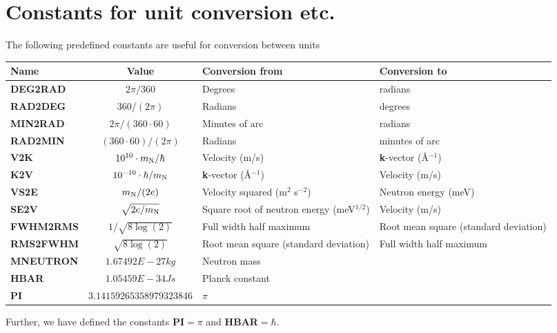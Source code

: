 \section{Constants for unit conversion etc.}
The following predefined constants are useful for conversion
between units
\def\textvb{\textbf}
\begin{center}
\begin{tabular}{|l|c|p{}|p{}|}
\hline
Name & Value & Conversion from & Conversion to \\ \hline
\textvb{DEG2RAD} & $2 \pi / 360$ & Degrees & radians \\
\textvb{RAD2DEG} & $360 / (2 \pi)$ & Radians & degrees \\
\textvb{MIN2RAD} & $2 \pi / (360 \cdot 60)$ 
  & Minutes of arc & radians \\
\textvb{RAD2MIN} & $(360\cdot 60) / (2 \pi)$ 
  & Radians & minutes of arc \\
\textvb{V2K} & $10^{10} \cdot m_{\rm N}/\hbar$ 
  & Velocity (m/s) & {\bf k}-vector (\AA$^{-1}$) \\ 
\textvb{K2V} & $10^{-10} \cdot \hbar / m_{\rm N}$ 
  & {\bf k}-vector (\AA$^{-1}$) & Velocity (m/s) \\
\textvb{VS2E} & $m_{\rm N} / (2 e)$
  & Velocity squared (m$^2$ s$^{-2}$) & Neutron energy (meV) \\
\textvb{SE2V} & $\sqrt{2 e/m_{\rm N}}$ 
  & Square root of neutron energy (meV$^{1/2}$) & Velocity (m/s) \\
\textvb{FWHM2RMS} & $1/\sqrt{8\log(2)}$ 
  & Full width half maximum & Root mean square (standard deviation) \\
\textvb{RMS2FWHM} & $\sqrt{8\log(2)}$ 
  & Root mean square (standard deviation) & Full width half maximum \\
\textvb{MNEUTRON} & $1.67492E-27 kg$ 
  & Neutron mass & \\
\textvb{HBAR} & $1.05459E-34 Js$ 
  & Planck constant & \\
\textvb{PI} & $3.14159265358979323846$ 
  & $\pi$ & \\
\hline
\end{tabular}
\end{center}

Further, we have defined the constants \textvb{PI}$=\pi$ and \textvb{HBAR}$=\hbar$.
